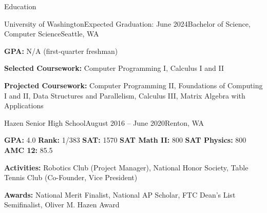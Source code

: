 \documentclass{resume} %
\begin{document}

\begin{rSection}{Education}

\begin{education}{University of Washington}{Expected Graduation: June 2024}{Bachelor of Science, Computer Science}{Seattle, WA}
\item {\bf GPA:} N/A (first-quarter freshman)
\item {\bf Selected Coursework:} Computer Programming I, Calculus I and II
\item {\bf Projected Coursework:} Computer Programming II, Foundations of Computing I and II, Data Structures and Parallelism, Calculus III, Matrix Algebra with Applications
\end{education}

\begin{education}{Hazen Senior High School}{August 2016 – June 2020}{}{Renton, WA}
\item {\bf GPA:} 4.0 {\bf Rank:} 1/383 {\bf SAT:} 1570 {\bf SAT Math II:} 800 {\bf SAT Physics:} 800 {\bf AMC 12:} 85.5
\item {\bf Activities:} Robotics Club (Project Manager), National Honor Society, Table Tennis Club (Co-Founder, Vice President)
\item {\bf Awards:} National Merit Finalist, National AP Scholar, FTC Dean's List Semifinalist, Oliver M. Hazen Award
\end{education}

\end{rSection}

\end{document}
